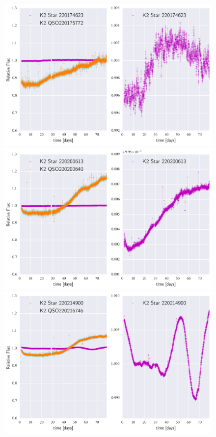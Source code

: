 \documentclass[a4paper,fleqn,usenatbib]{mnras}
\begin{document}
        
        \begin{figure}
 	\includegraphics[width=\columnwidth]{220175772NearestNeighbor.png}
 	\includegraphics[width=\columnwidth]{220200640NearestNeighbor.png}
 	\includegraphics[width=\columnwidth]{220216746NearestNeighbor.png}
        		\caption{}
        		\label{fig:example_figure}
        	\end{figure}   
        	
\end{document}
